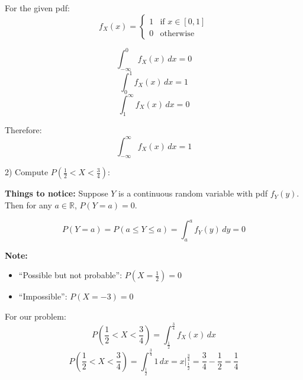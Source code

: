 \documentclass{article}
\begin{document}
    For the given pdf:
    \[
        f_X(x) =
        \begin{cases} 
            1 & \text{if } x \in [0, 1] \\
            0 & \text{otherwise}
        \end{cases}
    \]

    \begin{center}
    \end{center}

    \[
        \int_{- \infty}^{0} f_X(x) \, dx = 0
    \]
    \[
        \int_{0}^{1} f_X(x) \, dx = 1
    \]
    \[
        \int_{1}^{\infty} f_X(x) \, dx = 0
    \]

    Therefore:
    \[
        \int_{- \infty}^{\infty} f_X(x) \, dx = 1
    \]

    2) Compute \(P\left(\frac{1}{2} < X < \frac{3}{4}\right)\):

    \textbf{Things to notice:} Suppose \(Y\) is a continuous random variable with pdf \(f_Y(y)\). Then for any \(a \in \mathbb{R}\), \(P(Y=a) = 0\).

    \[
        P(Y=a) = P(a \leq Y \leq a) = \int_a^a f_Y(y) \, dy = 0
    \]

    \textbf{Note:}
    \begin{itemize}
        \item ``Possible but not probable'': $P(X = \frac{1}{2}) = 0$
        \item ``Impossible'': $P(X = -3) = 0$
    \end{itemize}



    For our problem:
    \[
        P\left(\frac{1}{2} < X < \frac{3}{4}\right) = \int_{\frac{1}{2}}^{\frac{3}{4}} f_X(x) \, dx
    \]
    \[
        P\left(\frac{1}{2} < X < \frac{3}{4}\right) = \int_{\frac{1}{2}}^{\frac{3}{4}} 1 \, dx = \left. x \right|_{\frac{1}{2}}^{\frac{3}{4}} = \frac{3}{4} - \frac{1}{2} = \frac{1}{4}
    \]
\end{document}
